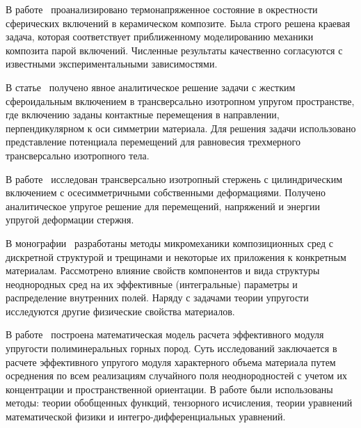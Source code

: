 В работе~\cite{Golovchan2000} проанализировано термонапряженное состояние в окрестности сферических включений в   керамическом композите. Была строго решена краевая задача, которая соответствует приближенному моделированию механики композита парой включений. Численные результаты качественно согласуются с известными экспериментальными зависимостями.

В статье~\cite{Zureick1988} получено явное аналитическое решение задачи с жестким сфероидальным включением в трансверсально изотропном упругом пространстве, где включению заданы контактные перемещения в направлении, перпендикулярном к оси симметрии материала. Для решения задачи использовано представление потенциала перемещений для равновесия трехмерного трансверсально изотропного тела.

В работе~\cite{Zhong} исследован трансверсально изотропный стержень с цилиндрическим включением с осесимметричными собственными деформациями. Получено аналитическое упругое решение для перемещений, напряжений и энергии упругой деформации стержня.

В монографии~\cite{Vanin1985} разработаны методы микромеханики композиционных сред с дискретной структурой и трещинами и некоторые их приложения к конкретным материалам. Рассмотрено влияние свойств компонентов и вида структуры неоднородных сред на их эффективные (интегральные) параметры и распределение внутренних полей. Наряду с задачами теории упругости исследуются другие физические свойства материалов.


В работе~\cite{Shailiev} построена математическая модель расчета эффективного модуля упругости полиминеральных горных пород. Суть исследований заключается в расчете эффективного упругого модуля характерного объема материала путем осреднения по всем реализациям случайного поля неоднородностей с учетом их концентрации и пространственной ориентации. В работе были использованы методы: теории обобщенных функций, тензорного исчисления, теории уравнений математической физики и ин\-тег\-ро-\-диф\-фе\-рен\-ци\-аль\-ных уравнений.

